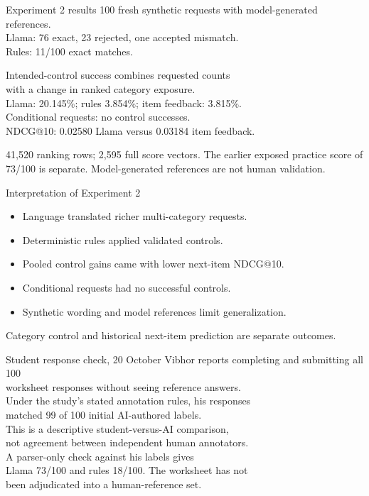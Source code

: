 \documentclass[10pt]{beamer}
\begin{document}
\begin{frame}{Experiment 2 results}
\small
100 fresh synthetic requests with model-generated references.\\
Llama: 76 exact, 23 rejected, one accepted mismatch.\\
Rules: 11/100 exact matches.

Intended-control success combines requested counts\\
with a change in ranked category exposure.\\
Llama: 20.145\%; rules 3.854\%; item feedback: 3.815\%.\\
Conditional requests: no control successes.\\
NDCG@10: 0.02580 Llama versus 0.03184 item feedback.

41,520 ranking rows; 2,595 full score vectors.
\vfill
\tiny The earlier exposed practice score of 73/100 is separate. Model-generated references are not human validation.
\end{frame}

\begin{frame}{Interpretation of Experiment 2}
\small
\begin{itemize}
\item Language translated richer multi-category requests.
\item Deterministic rules applied validated controls.
\item Pooled control gains came with lower next-item NDCG@10.
\item Conditional requests had no successful controls.
\item Synthetic wording and model references limit generalization.
\end{itemize}
\vfill
\tiny Category control and historical next-item prediction are separate outcomes.
\end{frame}

\begin{frame}{Student response check, 20 October}
\small
Vibhor reports completing and submitting all 100\\
worksheet responses without seeing reference answers.\\[0.2cm]
Under the study's stated annotation rules, his responses\\
matched 99 of 100 initial AI-authored labels.\\[0.2cm]
This is a descriptive student-versus-AI comparison,\\
not agreement between independent human annotators.\\[0.2cm]
A parser-only check against his labels gives\\
Llama 73/100 and rules 18/100. The worksheet has not\\
been adjudicated into a human-reference set.
\end{frame}
\end{document}
